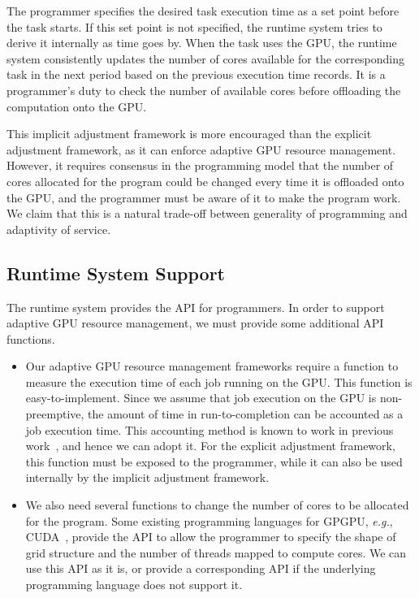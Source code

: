 \documentclass[times, 10pt, twocolumn]{article}
\begin{document}
The programmer specifies the desired task execution time as a set point
before the task starts.
If this set point is not specified, the runtime system tries to derive
it internally as time goes by.
When the task uses the GPU, the runtime system consistently updates the
number of cores available for the corresponding task in the next period
based on the previous execution time records.
It is a programmer's duty to check the number of available cores before
offloading the computation onto the GPU.

This implicit adjustment framework is more encouraged than the explicit
adjustment framework, as it can enforce adaptive GPU resource
management.
However, it requires consensus in the programming model that the number
of cores allocated for the program could be changed every time it is
offloaded onto the GPU, and the programmer must be aware of it to make
the program work.
We claim that this is a natural trade-off between generality of
programming and adaptivity of service.

\subsection{Runtime System Support}
\label{sec:runtime}

The runtime system provides the API for programmers.
In order to support adaptive GPU resource management, we must provide
some additional API functions.

\begin{itemize}
 \item Our adaptive GPU resource management frameworks require a
       function to measure the execution time of each job running on the
       GPU.
       This function is easy-to-implement.
       Since we assume that job execution on the GPU is non-preemptive,
       the amount of time in run-to-completion can be accounted as a job
       execution time.
       This accounting method is known to work in previous
       work~\cite{Kato_ATC11, Rossbach_SOSP11}, and hence we can adopt
       it.
       For the explicit adjustment framework, this function must be
       exposed to the programmer, while it can also be used internally
       by the implicit adjustment framework.
 \item We also need several functions to change the number of cores to
       be allocated for the program.
       Some existing programming languages for GPGPU, \textit{e.g.},
       CUDA~\cite{CUDA}, provide the API to allow the programmer to
       specify the shape of grid structure and the number of threads
       mapped to compute cores.
       We can use this API as it is, or provide a corresponding API if
       the underlying programming language does not support it.
\end{itemize}
\end{document}
